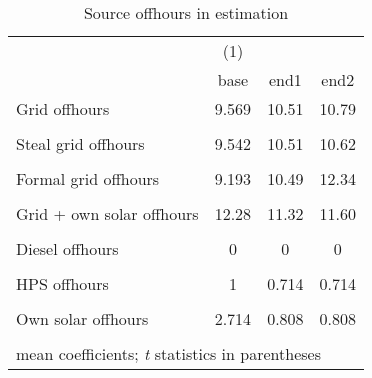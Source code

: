 \begin{table}[htbp]\centering
\caption{Source offhours in estimation}
\begin{tabular}{l*{3}{c}}
\toprule
                &\multicolumn{1}{c}{(1)}&         &         \\
                &     base&     end1&     end2\\
\midrule
Grid offhours   &    9.569&    10.51&    10.79\\
                &         &         &         \\
\addlinespace
Steal grid offhours&    9.542&    10.51&    10.62\\
                &         &         &         \\
\addlinespace
Formal grid offhours&    9.193&    10.49&    12.34\\
                &         &         &         \\
\addlinespace
Grid + own solar offhours&    12.28&    11.32&    11.60\\
                &         &         &         \\
\addlinespace
Diesel offhours &        0&        0&        0\\
                &         &         &         \\
\addlinespace
HPS offhours    &        1&    0.714&    0.714\\
                &         &         &         \\
\addlinespace
Own solar offhours&    2.714&    0.808&    0.808\\
                &         &         &         \\
\bottomrule
\multicolumn{4}{l}{\footnotesize mean coefficients; \textit{t} statistics in parentheses}\\
\end{tabular}
\end{table}
